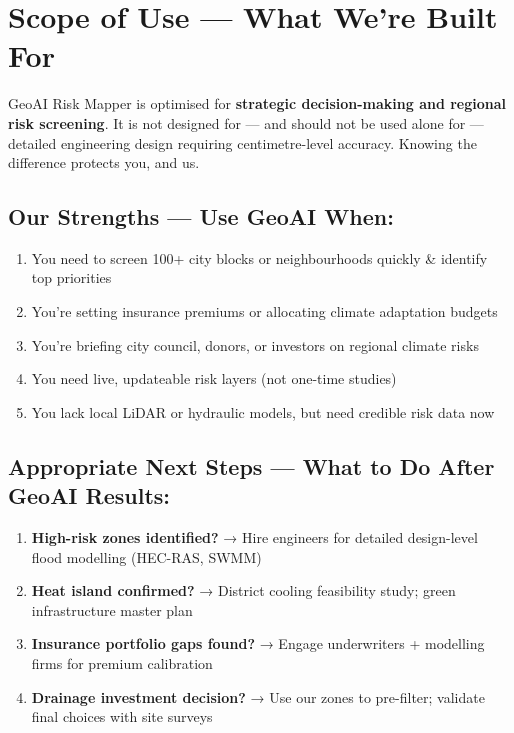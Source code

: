 \documentclass[11pt, a4paper]{article}
\begin{document}
\section{Scope of Use — What We're Built For}

GeoAI Risk Mapper is optimised for \textbf{strategic decision-making and regional risk screening}.
It is not designed for — and should not be used alone for — detailed engineering design requiring centimetre-level accuracy.
Knowing the difference protects you, and us.

\subsection*{Our Strengths — Use GeoAI When:}

\begin{enumerate}[label=$\checkmark$, leftmargin=1.5em, itemsep=3pt]
  \item You need to screen 100+ city blocks or neighbourhoods quickly \& identify top priorities
  \item You're setting insurance premiums or allocating climate adaptation budgets
  \item You're briefing city council, donors, or investors on regional climate risks
  \item You need live, updateable risk layers (not one-time studies)
  \item You lack local LiDAR or hydraulic models, but need credible risk data now
\end{enumerate}

\subsection*{Appropriate Next Steps — What to Do After GeoAI Results:}

\begin{enumerate}[label=$\bullet$, leftmargin=1.5em, itemsep=3pt]
  \item \textbf{High-risk zones identified?} → Hire engineers for detailed design-level flood modelling (HEC-RAS, SWMM)
  \item \textbf{Heat island confirmed?} → District cooling feasibility study; green infrastructure master plan
  \item \textbf{Insurance portfolio gaps found?} → Engage underwriters + modelling firms for premium calibration
  \item \textbf{Drainage investment decision?} → Use our zones to pre-filter; validate final choices with site surveys
\end{enumerate}
\end{document}

